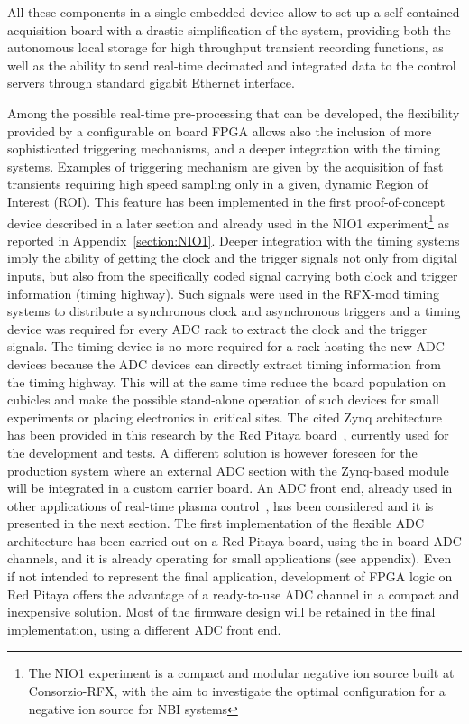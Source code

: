 All these components in a single embedded device allow to set-up a self-contained acquisition board with a drastic simplification of the system, providing both the autonomous local storage for high throughput transient recording functions, as well as the ability to send real-time decimated and integrated data to the control servers through standard gigabit Ethernet interface. 

Among the possible real-time pre-processing that can be developed, the flexibility provided by a configurable on board FPGA allows also the inclusion of more sophisticated triggering mechanisms, and a deeper integration with the timing systems. Examples of triggering mechanism are given by the acquisition of fast transients requiring high speed sampling only in a given, dynamic Region of Interest (ROI). This feature has been implemented in the first proof-of-concept device described in a later section and already used in the NIO1 experiment\footnote{The NIO1 experiment is a compact and modular negative ion source built at Consorzio-RFX, with the aim to investigate the optimal configuration for a negative ion source for \acs{NBI} systems} as reported in Appendix~\cref{section:NIO1}. Deeper integration with the timing systems imply the ability of getting the clock and the trigger signals not only from digital inputs, but also from the specifically coded signal carrying both clock and trigger information (timing highway)\cite{dio4}. Such signals were used in the RFX-mod timing systems to distribute a synchronous clock and asynchronous triggers and a timing device was required for every ADC rack to extract the clock and the trigger signals. The timing device is no more required for a rack hosting the new ADC devices because the ADC devices can directly extract timing information from the timing highway. This will at the same time reduce the board population on cubicles and make the possible stand-alone operation of such devices for small experiments or placing electronics in critical sites.
%
The cited Zynq architecture has been provided in this research by the Red Pitaya board~\cite{redpitaya}, currently used for the development and tests. A different solution is however foreseen for the production system where an external ADC section with the Zynq-based module will be integrated in a custom carrier board. 
An ADC front end, already used in other applications of real-time plasma control~\cite{ATCA-MIMO-ISOL}, has been considered and it is presented in the next section. 
The first implementation of the flexible ADC architecture has been carried out on a Red Pitaya board, using the in-board ADC channels, and it is already operating for small applications (see appendix). Even if not intended to represent the final application, development of FPGA logic on Red Pitaya offers the advantage of a ready-to-use ADC channel in a compact and inexpensive solution. Most of the firmware design will be retained in the final implementation, using a different ADC front end. 

